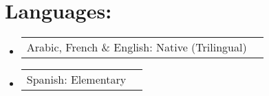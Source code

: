 \documentclass[letterpaper,11pt]{article}
\makeatletter
\newcommand{\resumePoint}[2]{
  \item
    \begin{tabular*}{0.97\textwidth}[t]{l@{\extracolsep{\fill}}r}
      #1 & \textbf{\small #2}
    \end{tabular*}
}
\newcommand{\resumeSubHeadingListStart}{\begin{itemize}[leftmargin=*]}
\newcommand{\resumeSubHeadingListEnd}{\end{itemize}}
\makeatother
\begin{document}

 \section{Languages:}
  \resumeSubHeadingListStart
    \resumePoint
     {Arabic, French \& English: Native (Trilingual)}{}
   \vspace*{-0.7cm}
    \resumePoint
     {Spanish: Elementary}{}
  \resumeSubHeadingListEnd


\end{document}
